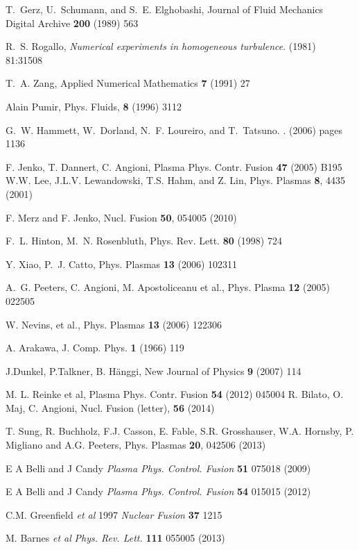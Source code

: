 \begin{thebibliography}{10}
T.~Gerz, U.~Schumann, and S.~E. Elghobashi, Journal of Fluid Mechanics Digital Archive {\bf 200} 
(1989) 563

R.~S. {Rogallo}, {\em Numerical experiments in homogeneous turbulence}.
 (1981) 81:31508

T.~A. {Zang}, Applied Numerical Mathematics {\bf 7} (1991) 27

 Alain Pumir, Phys. Fluids, {\bf 8} (1996) 3112

G.~W. {Hammett}, W.~{Dorland}, N.~F. {Loureiro}, and T.~{Tatsuno}.
.
 (2006) pages 1136 

 F. Jenko, T. Dannert, C. Angioni, Plasma Phys. Contr. Fusion {\bf 47} (2005) B195
 W.W. Lee, J.L.V. Lewandowski, T.S. Hahm, and Z. Lin, Phys. Plasmas {\bf 8}, 4435 (2001)

  F. Merz and F. Jenko, Nucl. Fusion {\bf 50}, 054005 (2010)

 F.~L. Hinton, M.~N. Rosenbluth, Phys. Rev. Lett. {\bf 80} (1998) 724

 Y. Xiao, P.~J. Catto, Phys. Plasmas {\bf 13} (2006) 102311 

 A.~G. Peeters, C. Angioni, M. Apostoliceanu et al., Phys. Plasma {\bf  12} (2005) 022505   

 W. Nevins, et al., Phys. Plasmas {\bf 13} (2006) 122306

 A. Arakawa, J. Comp. Phys. {\bf 1} (1966) 119 

 J.Dunkel, P.Talkner, B. H\"anggi, New Journal of Physics {\bf 9} (2007) 114

 M. L. Reinke et al, Plasma Phys. Contr. Fusion {\bf 54} (2012) 045004
 R. Bilato, O. Maj, C. Angioni, Nucl. Fusion (letter), {\bf 56} (2014) 


 T. Sung, R. Buchholz, F.J. Casson, E. Fable, S.R. Grosshauser, W.A. Hornsby, P. Migliano and A.G. Peeters, 
Phys. Plasmas {\bf 20}, 042506 (2013)

 E A Belli and J Candy {\it Plasma Phys. Control. Fusion} {\bf 51} 075018  (2009)

 E A Belli and J Candy {\it Plasma Phys. Control. Fusion} {\bf 54} 015015 (2012) 

 C.M. Greenfield {\it et al} 1997 {\it Nuclear Fusion} {\bf 37} 1215

 M. Barnes {\it et al} {\it Phys. Rev. Lett.} {\bf 111} 055005 (2013)


\end{thebibliography}

